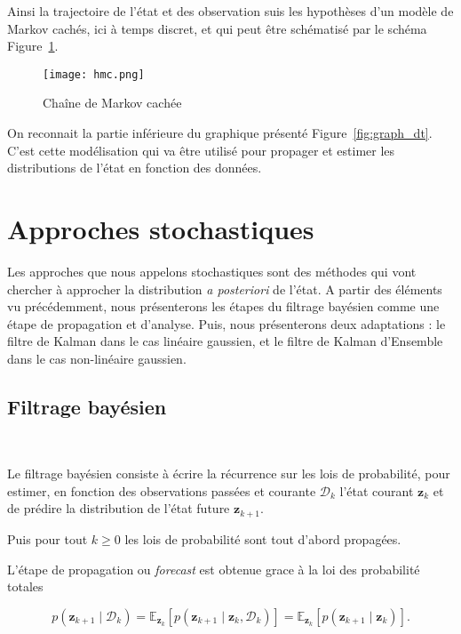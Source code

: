 Ainsi la trajectoire de l'état et des observation suis les hypothèses d'un modèle de Markov cachés, ici à temps discret, et qui peut être schématisé par le schéma Figure~\ref{fig:hidden_markov}.

\begin{figure}[h]
    \centering
    \texttt{[image: hmc.png]}
    \caption{Chaîne de Markov cachée}
    \label{fig:hidden_markov}
\end{figure}

On reconnait la partie inférieure du graphique présenté Figure~\ref{fig:graph_dt}. C'est cette modélisation qui va être utilisé pour propager et estimer les distributions de l'état en fonction des données.

\section{Approches stochastiques}

Les approches que nous appelons stochastiques sont des méthodes qui vont chercher à approcher la distribution \textit{a posteriori} de l'état. A partir des éléments vu précédemment, nous présenterons les étapes du filtrage bayésien comme une étape de propagation et d'analyse. Puis, nous présenterons deux adaptations : le filtre de Kalman dans le cas linéaire gaussien, et le filtre de Kalman d'Ensemble dans le cas non-linéaire gaussien.

\subsection{Filtrage bayésien}~\label{filtrage_bayesien}

Le filtrage bayésien consiste à écrire la récurrence sur les lois de probabilité, pour estimer, en fonction des observations passées et courante $\mathcal D_k$ l'état courant $\bm z_k$ et de prédire la distribution de l'état future $\bm z_{k+1}$.

Puis pour tout $k \geq 0$ les lois de probabilité sont tout d'abord propagées.

L'étape de propagation ou \textit{forecast} est obtenue grace à la loi des probabilité totales

\begin{equation*}
    p(\bm z_{k+1} \mid \mathcal D_k) = \mathbb{E}_{\bm z_k}\left[p(\bm z_{k+1} \mid  \bm z_k,\mathcal{D}_k) \right] = \mathbb{E}_{\bm z_k}\left[p(\bm z_{k+1} \mid \bm z_k)\right].
\end{equation*}

